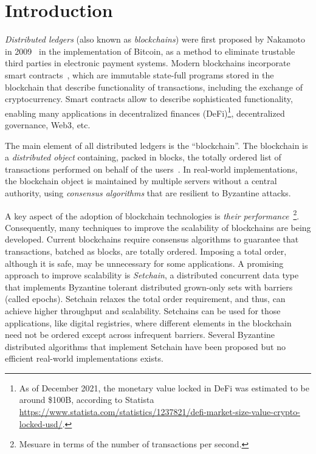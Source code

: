 \section{Introduction}
\emph{Distributed ledgers} (also known as \emph{blockchains}) were first proposed
by Nakamoto in 2009~\cite{nakamoto06bitcoin} in the implementation of Bitcoin,
as a method to eliminate trustable third parties in electronic payment systems.
%
Modern blockchains incorporate smart
contracts~\cite{szabo96smart,ethereum}, 
which are immutable state-full
programs stored in the blockchain that describe functionality of transactions,
including the exchange of cryptocurrency.
%
Smart contracts allow to describe sophisticated functionality, enabling
many applications in decentralized finances (DeFi)\footnote{As of December 2021, the monetary value locked in DeFi
  was estimated to be around \$100B, according to Statista
  \url{https://www.statista.com/statistics/1237821/defi-market-size-value-crypto-locked-usd/}.},
  decentralized governance,
Web3, etc.

The main element of all distributed ledgers is the ``blockchain''.
%
The blockchain is a \emph{distributed object} containing, packed in blocks, the
totally ordered list of transactions performed on behalf of the
users~\cite{anta2018formalizing,anta2021principles}.
%
In real-world implementations, the blockchain object is maintained by multiple
servers without a central authority, using \emph{consensus algorithms} that are
resilient to Byzantine attacks.

%
A key aspect of the adoption of blockchain technologies is \emph{their
performance}~\footnote{Mesuare in terms of the number of transactions per
second.}.
%
Consequently, many techniques to improve the scalability of
blockchains are being developed.
%
Current blockchains require consensus algorithms to guarantee that
transactions, batched as blocks, are totally ordered.
%
Imposing a total order, although it is safe, may be unnecessary for some
applications.
%
A promising approach to improve scalability is \emph{Setchain}, a distributed
concurrent data type that implements Byzantine tolerant distributed grown-only
sets with barriers (called epochs).
%
Setchain relaxes the total order requirement, and thus, can achieve higher
throughput and scalability.
%
Setchains can be used for those applications, like digital
registries, where different elements in the blockchain need not be
ordered except across infrequent barriers.
%
Several Byzantine distributed algorithms that implement Setchain
have been proposed but no efficient real-world implementations
exists.

